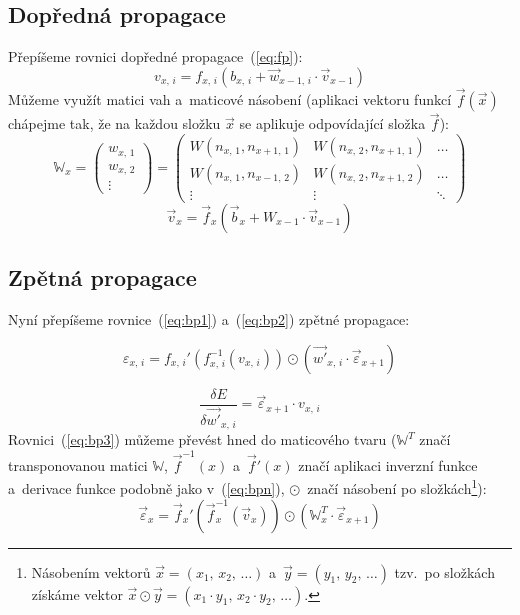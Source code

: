 \documentclass[12pt]{report}			%
\newcommand{\W}{\mathbb{W}}
\begin{document}
					\subsection{Dopředná propagace}
					Přepíšeme rovnici dopředné propagace~(\ref{eq:fp}):
					\begin{equation} v_{x,\,i} = f_{x,\,i}\left(b_{x,\,i} + \vec{w}_{x-1,\,i} \cdot \vec{v}_{x-1} \right) \end{equation}
					Můžeme využít matici vah a~maticové násobení (aplikaci vektoru funkcí $\vec{f}(\vec{x})$ chápejme tak, že na každou složku $\vec{x}$ se aplikuje odpovídající složka $\vec{f}$):
					\begin{equation}
						\W_x = \begin{pmatrix}
							w_{x,\,1} \\
							w_{x,\,2} \\
							\vdots
						\end{pmatrix} = \begin{pmatrix}
							W\left(n_{x,\,1}, n_{x+1,\,1}\right) & W\left(n_{x,\,2}, n_{x+1,\,1}\right) & \ldots \\
							W\left(n_{x,\,1}, n_{x-1,\,2}\right) & W\left(n_{x,\,2}, n_{x+1,\,2}\right) & \ldots \\
							\vdots & \vdots & \ddots
						\end{pmatrix}
						\label{eq:wm}
					\end{equation}
					\begin{equation} \vec{v}_x = \vec{f}_x\left(\vec{b}_x + W_{x-1} \cdot \vec{v}_{x-1} \right) \label{eq:bpn} \end{equation}
					
					\subsection{Zpětná propagace}
					Nyní přepíšeme rovnice~(\ref{eq:bp1}) a~(\ref{eq:bp2}) zpětné propagace:
					
					\begin{equation} \varepsilon_{x,\,i} = f_{x,\,i}'\left(f_{x,\,i}^{-1}(v_{x,\,i})\right) \odot \left(\vec{w'}_{x,\,i} \cdot \vec{\varepsilon}_{x+1}\right) \label{eq:bp3} \end{equation}
					
					\begin{equation} \frac{\delta E}{\delta\vec{w'}_{x,\,i}} = \vec{\varepsilon}_{x+1}\cdot v_{x,\,i} \label{eq:bp4}\end{equation}
					Rovnici~(\ref{eq:bp3}) můžeme převést hned do maticového tvaru ($\W^T$ značí transponovanou matici $\W$, $\vec{f}^{-1}(x)$ a~$\vec{f}'(x)$ značí aplikaci inverzní funkce a~derivace funkce podobně jako v~(\ref{eq:bpn}), $\odot$~značí násobení po složkách\footnote{Násobením vektorů $\vec{x} = \left(x_1,\,x_2,\,\ldots\right)$ a~$\vec{y} = \left(y_1,\,y_2,\,\ldots\right)$ tzv.~po složkách získáme vektor $\vec{x}\odot\vec{y} = \left(x_1\cdot y_1,\,x_2 \cdot y_2,\,\ldots\right)$.}):
					\begin{equation} \vec{\varepsilon}_x = \vec{f}_x'\left(\vec{f}_x^{-1}(\vec{v}_x)\right) \odot \left(\W_x^T \cdot \vec{\varepsilon}_{x+1}\right)  \label{eq:bpab} \end{equation}
					
\end{document}
